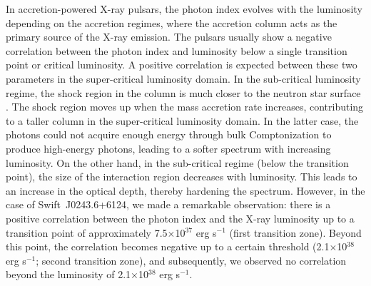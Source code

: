 \documentclass[twocolumn,trackchanges]{aastex631}
\begin{document}
In accretion-powered X-ray pulsars, the photon index evolves with the luminosity depending on the accretion regimes, where the accretion column acts as the primary source of the X-ray emission. The pulsars usually show a negative correlation between the photon index and luminosity below a single transition point or critical luminosity. A positive correlation is expected between these two parameters in the super-critical luminosity domain. In the sub-critical luminosity regime, the shock region in the column is much closer to the neutron star surface \citep{2012A&A...544A.123B}. The shock region moves up when the mass accretion rate increases, contributing to a taller column in the super-critical luminosity domain. In the latter case, the photons could not acquire enough energy through bulk Comptonization to produce high-energy photons, leading to a softer spectrum with increasing luminosity. On the other hand, in the sub-critical regime (below the transition point), the size of the interaction region decreases with luminosity. This leads to an increase in the optical depth, thereby hardening the spectrum. However, in the case of Swift~J0243.6+6124, we made a remarkable observation: there is a positive correlation between the photon index and the X-ray luminosity up to a transition point of approximately 7.5$\times$10$^{37}$  erg s$^{-1}$ (first transition zone). Beyond this point, the correlation becomes negative up to a certain threshold (2.1$\times$10$^{38}$ erg s$^{-1}$; second transition zone), and subsequently, we observed no correlation beyond the luminosity of 2.1$\times$10$^{38}$ erg s$^{-1}$.
\end{document}
